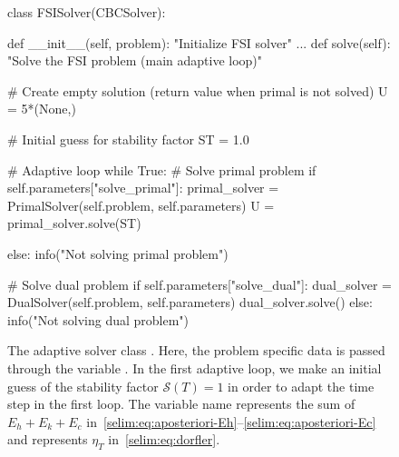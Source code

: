 \begin{figure}
\bwfig
  \caption{The adaptive solver class . Here, the
    problem specific data is passed through the variable . In
    the first adaptive loop, we make an initial guess of the stability
    factor $\mathcal{S}(T)=1$ in order to adapt the time step in the
    first loop.  The variable name  represents the sum of
    $E_h + E_k + E_c$ in~\eqref{selim:eq:aposteriori-Eh}--\eqref{selim:eq:aposteriori-Ec} and
     represents $\eta_T$ in~\eqref{selim:eq:dorfler}.}
\begin{python}
class FSISolver(CBCSolver):

    def __init__(self, problem):
        "Initialize FSI solver"
            ...
    def solve(self):
        "Solve the FSI problem (main adaptive loop)"

        # Create empty solution (return value when primal is not solved)
        U = 5*(None,)

        # Initial guess for stability factor
        ST = 1.0

        # Adaptive loop
        while True:
            # Solve primal problem
            if self.parameters["solve_primal"]:
                primal_solver = PrimalSolver(self.problem, self.parameters)
                U = primal_solver.solve(ST)

            else:
                info("Not solving primal problem")

            # Solve dual problem
            if self.parameters["solve_dual"]:
                dual_solver = DualSolver(self.problem, self.parameters)
                dual_solver.solve()
            else:
                info("Not solving dual problem")
\end{python}
\label{selim:fig:FSISolver-1}
\end{figure}

